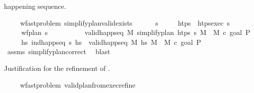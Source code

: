 \begin{isabellebody}
\begin{isamarkuptext}
  happening sequence.%
\end{isamarkuptext}\isamarkuptrue%
\ \ \isamarkupfalse%
\ {\isacharparenleft}{\kern0pt}\ wf{\isacharunderscore}{\kern0pt}ast{\isacharunderscore}{\kern0pt}problem{\isacharparenright}{\kern0pt}\ simplify{\isacharunderscore}{\kern0pt}plan{\isacharunderscore}{\kern0pt}valid{\isacharunderscore}{\kern0pt}exists{}{\isacharcolon}{\kern0pt}\ \isanewline
\ \ \ \ \ {\isasympi}s\isanewline
\ \ \ \ \ {\isachardoublequoteopen}htps\ {\isasymequiv}\ htps{\isacharunderscore}{\kern0pt}exec\ {\isasympi}s{\isachardoublequoteclose}\isanewline
\ \ \ \ \ {\isachardoublequoteopen}wf{\isacharunderscore}{\kern0pt}plan\ {\isasympi}s{\isachardoublequoteclose}\ \isanewline
\ \ \ \ \ \ \ \ \ {\isachardoublequoteopen}valid{\isacharunderscore}{\kern0pt}happ{\isacharunderscore}{\kern0pt}seq\ M\ {\isacharparenleft}{\kern0pt}simplify{\isacharunderscore}{\kern0pt}plan\ htps\ {\isasympi}s{\isacharparenright}{\kern0pt}\ M{\isacharprime}{\kern0pt}\ {\isasymand}\ M{\isacharprime}{\kern0pt}\ \isactrlsup c{\isasymTTurnstile}\isactrlsub {\isacharequal}{\kern0pt}\ {\isacharparenleft}{\kern0pt}goal\ P{\isacharparenright}{\kern0pt}{\isachardoublequoteclose}\isanewline
\ \ \ \ \ {\isachardoublequoteopen}{\isasymexists}hs{\isachardot}{\kern0pt}\ ind{\isacharunderscore}{\kern0pt}happ{\isacharunderscore}{\kern0pt}seq\ {\isasympi}s\ hs\ {\isasymand}\ valid{\isacharunderscore}{\kern0pt}happ{\isacharunderscore}{\kern0pt}seq\ M\ hs\ M{\isacharprime}{\kern0pt}\ {\isasymand}\ M{\isacharprime}{\kern0pt}\ \isactrlsup c{\isasymTTurnstile}\isactrlsub {\isacharequal}{\kern0pt}\ {\isacharparenleft}{\kern0pt}goal\ P{\isacharparenright}{\kern0pt}{\isachardoublequoteclose}\isanewline
%
\isadelimproof
\ \ \ \ %
\endisadelimproof
%
\isatagproof
{}\isamarkupfalse%
\ assms\ simplify{\isacharunderscore}{\kern0pt}plan{\isacharunderscore}{\kern0pt}correct\ \isamarkupfalse%
\ blast%
\endisatagproof
{\isafoldproof}%
%
\isadelimproof
%
\endisadelimproof
%
\begin{isamarkuptext}%
Justification for the refinement of .%
\end{isamarkuptext}\isamarkuptrue%
\ \ \isamarkupfalse%
\ {\isacharparenleft}{\kern0pt}\ wf{\isacharunderscore}{\kern0pt}ast{\isacharunderscore}{\kern0pt}problem{\isacharparenright}{\kern0pt}\ valid{\isacharunderscore}{\kern0pt}plan{\isacharunderscore}{\kern0pt}from{}{\isacharunderscore}{\kern0pt}exec{\isacharunderscore}{\kern0pt}refine{\isacharcolon}{\kern0pt}\ \isanewline

\end{isabellebody}
